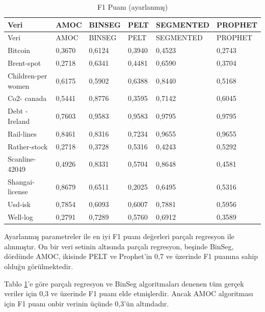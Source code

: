 \documentclass[12pt,twoside]{deuthesis}
\begin{document}
\begin{longtable}[]{@{}llllll@{}}
\caption{\label{tab:nvar4} F1 Puanı (ayarlanmış)}\tabularnewline
\toprule\noalign{}
Veri & AMOC & BINSEG & PELT & SEGMENTED & PROPHET \\
\midrule\noalign{}
\endfirsthead
\toprule\noalign{}
Veri & AMOC & BINSEG & PELT & SEGMENTED & PROPHET \\
\midrule\noalign{}
\endhead
\bottomrule\noalign{}
\endlastfoot
Bitcoin & 0,3670 & 0,6124 & 0,3940 & 0,4523 & 0,2743 \\
Brent-spot & 0,2718 & 0,6341 & 0,4481 & 0,6590 & 0,3704 \\
Children-per women & 0,6175 & 0,5902 & 0,6388 & 0,8440 & 0,5168 \\
Co2- canada & 0,5441 & 0,8776 & 0,3595 & 0,7142 & 0,6045 \\
Debt -Ireland & 0,7603 & 0,9583 & 0,9583 & 0,9795 & 0,9795 \\
Rail-lines & 0,8461 & 0,8316 & 0,7234 & 0,9655 & 0,9655 \\
Rather-stock & 0,2718 & 0,3728 & 0,5316 & 0,4243 & 0,5292 \\
Scanline-42049 & 0,4926 & 0,8331 & 0,5704 & 0,8648 & 0,4581 \\
Shangai-license & 0,8679 & 0,6511 & 0,2025 & 0,6495 & 0,5316 \\
Usd-isk & 0,7854 & 0,6093 & 0,6007 & 0,7881 & 0,5956 \\
Well-log & 0,2791 & 0,7289 & 0,5760 & 0,6912 & 0,3589 \\
\end{longtable}

Ayarlanmış parametreler ile en iyi F1 puanı değerleri parçalı regresyon ile alınmıştır. On bir veri setinin altısında parçalı regresyon, beşinde BinSeg, dördünde AMOC, ikisinde PELT ve Prophet'in 0,7 ve üzerinde F1 puanına sahip olduğu görülmektedir.

Tablo \ref{tab:nvar4}'e göre parçalı regresyon ve BinSeg algoritmaları denenen tüm gerçek veriler için 0,3 ve üzerinde F1 puanı elde etmişlerdir. Ancak AMOC algoritması için F1 puanı onbir verinin üçünde 0,3'ün altındadır.
\end{document}
